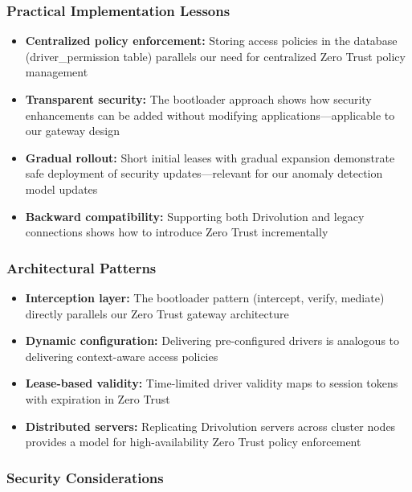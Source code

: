 \subsubsection{Practical Implementation Lessons}

\begin{itemize}
    \item \textbf{Centralized policy enforcement:} Storing access policies in the database (driver\_permission table) parallels our need for centralized Zero Trust policy management
    \item \textbf{Transparent security:} The bootloader approach shows how security enhancements can be added without modifying applications—applicable to our gateway design
    \item \textbf{Gradual rollout:} Short initial leases with gradual expansion demonstrate safe deployment of security updates—relevant for our anomaly detection model updates
    \item \textbf{Backward compatibility:} Supporting both Drivolution and legacy connections shows how to introduce Zero Trust incrementally
\end{itemize}

\subsubsection{Architectural Patterns}

\begin{itemize}
    \item \textbf{Interception layer:} The bootloader pattern (intercept, verify, mediate) directly parallels our Zero Trust gateway architecture
    \item \textbf{Dynamic configuration:} Delivering pre-configured drivers is analogous to delivering context-aware access policies
    \item \textbf{Lease-based validity:} Time-limited driver validity maps to session tokens with expiration in Zero Trust
    \item \textbf{Distributed servers:} Replicating Drivolution servers across cluster nodes provides a model for high-availability Zero Trust policy enforcement
\end{itemize}

\subsubsection{Security Considerations}

